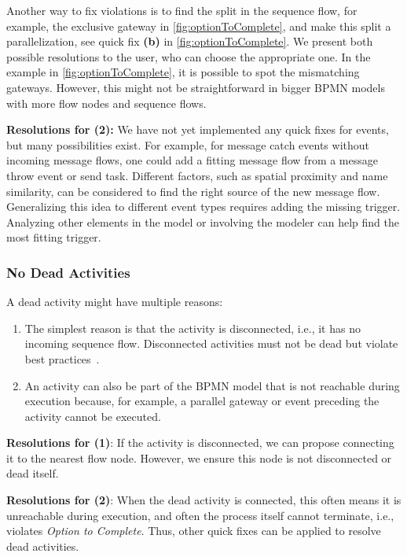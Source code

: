 \documentclass[runningheads]{llncs}
\begin{document}
Another way to fix violations is to find the split in the sequence flow, for example, the exclusive gateway in \autoref{fig:optionToComplete}, and make this split a parallelization, see quick fix \textbf{(b)} in \autoref{fig:optionToComplete}.
We present both possible resolutions to the user, who can choose the appropriate one.
In the example in \autoref{fig:optionToComplete}, it is possible to spot the mismatching gateways.
However, this might not be straightforward in bigger BPMN models with more flow nodes and sequence flows.

\textbf{Resolutions for (2):} We have not yet implemented any quick fixes for events, but many possibilities exist.
For example, for message catch events without incoming message flows, one could add a fitting message flow from a message throw event or send task.
Different factors, such as spatial proximity and name similarity, can be considered to find the right source of the new message flow.
Generalizing this idea to different event types requires adding the missing trigger.
Analyzing other elements in the model or involving the modeler can help find the most fitting trigger.

\subsubsection{No Dead Activities}
A dead activity might have multiple reasons:

\begin{enumerate}
	\item The simplest reason is that the activity is disconnected, i.e., it has no incoming sequence flow.
	Disconnected activities must not be dead but violate best practices~\cite{camundaservicesgmbhBpmnlint2024}.
	\item An activity can also be part of the BPMN model that is not reachable during execution because, for example, a parallel gateway or event preceding the activity cannot be executed.
\end{enumerate}

\textbf{Resolutions for (1)}: If the activity is disconnected, we can propose connecting it to the nearest flow node.
However, we ensure this node is not disconnected or dead itself.

\textbf{Resolutions for (2)}: When the dead activity is connected, this often means it is unreachable during execution, and often the process itself cannot terminate, i.e., violates \textit{Option to Complete}.
Thus, other quick fixes can be applied to resolve dead activities.
\end{document}
